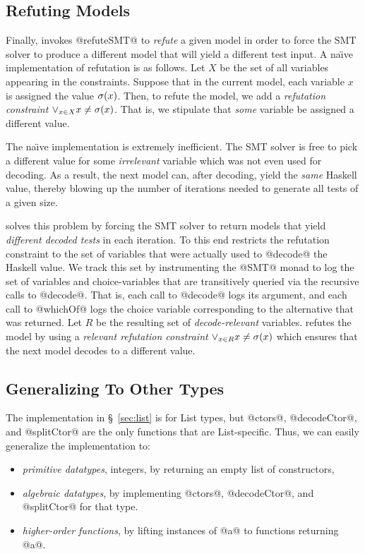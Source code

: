 \subsection{Refuting Models} \label{sec:refute}

Finally, \toolname invokes @refuteSMT@ to \emph{refute} a 
given model in order to force the SMT solver to produce a 
different model that will yield a different test input.
%
A na\"{\i}ve implementation of refutation is as follows.
%
Let $X$ be the set of all variables appearing in the constraints.
%
Suppose that in the current model, each variable $x$ is assigned 
the value $\sigma(x)$.
%
Then, to refute the model, we add a \emph{refutation constraint} 
$
\vee_{x \in X} x \not = \sigma(x)
$.
That is, we stipulate that \emph{some} variable be assigned a 
different value.

The na\"{\i}ve  implementation is extremely inefficient.
The SMT solver is free to pick a different value for some 
\emph{irrelevant} variable which was not even used for decoding.
%
As a result, the next model can, after decoding, yield the 
\emph{same} Haskell value, thereby blowing up the number of 
iterations needed to generate all tests of a given size.

\toolname solves this problem by forcing the SMT solver to return
models that yield \emph{different decoded tests} in each iteration.
To this end \toolname restricts the refutation constraint to 
the set of variables that were actually used to @decode@ the 
Haskell value.
%
We track this set by instrumenting the @SMT@ monad to log the 
set of variables and choice-variables that are transitively 
queried via the recursive calls to @decode@.
%
That is, each call to @decode@ logs its argument, and each call 
to @whichOf@ logs the choice variable corresponding to the 
alternative that was returned.
%
Let $R$ be the resulting set of \emph{decode-relevant} variables.
\toolname refutes the model by using a \emph{relevant refutation constraint}
$
\vee_{x \in R} x \not = \sigma(x)
$
which ensures that the next model decodes to a different value.%


\subsection{Generalizing \toolname To Other Types}\label{sec:generic}

The implementation in \S~\ref{sec:list} is for %
List types, but @ctors@, @decodeCtor@, and @splitCtor@ are the only 
functions that are List-specific. 
%
Thus, we can easily generalize the implementation to:
%
\begin{itemize}
%
\item{\emph{primitive datatypes}}, \eg integers, by returning an empty 
    list of constructors,
%    
\item{\emph{algebraic datatypes}}, by implementing @ctors@, @decodeCtor@, and @splitCtor@ for that type.
%
\item{\emph{higher-order functions}}, by lifting instances of @a@ to functions returning @a@.
\end{itemize}

